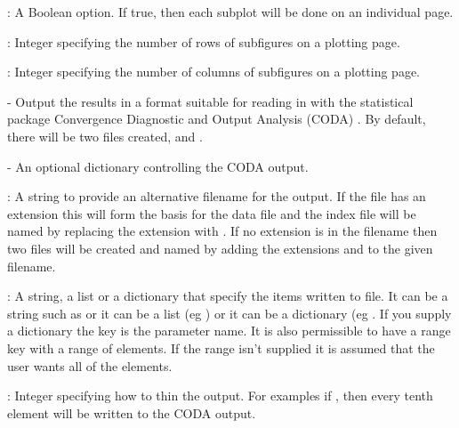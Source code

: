 \documentclass[article]{jss}
\begin{document}
\begin{description}
\begin{description}
\begin{description}
\begin{description}
    \item {}: A Boolean option. If true, then each
      subplot will be done on an individual page.
    \item {}: Integer specifying the number of rows of
      subfigures on a plotting page.
    \item {}: Integer specifying the number of columns of
      subfigures on a plotting page.
    \end{description}
  \end{description}

\item {} - Output the results in a format
  suitable for reading in with the statistical package Convergence
  Diagnostic and Output Analysis (CODA)
  \citep{Rnews:Plummer+Best+Cowles+Vines:2006}. By default, there will
  be two files created,  and .

    \begin{description}
    \item {} - An optional dictionary controlling the
      CODA output.

      \begin{description}
      \item {}: A string to provide an alternative
        filename for the output.  If the file has an extension this
        will form the basis for the data file and the index file will
        be named by replacing the extension with . If no
        extension is in the filename then two files will be created
        and named by adding the extensions  and 
        to the given filename.
      \item {}: A string, a list or a dictionary that
        specify the items written to file. It can be a string such as
         or it can be a list (eg
        ) or it can be a dictionary (eg \newline
        .  If you supply a
        dictionary the key is the parameter name. It is also
        permissible to have a range key with a range of elements. If
        the range isn't supplied it is assumed that the user wants all
        of the elements.
      \item {}: Integer specifying how to thin the output.
        For examples if , then every tenth element
        will be written to the CODA output.
      \end{description}
    \end{description}
  \end{description}
\end{description}
\end{document}
